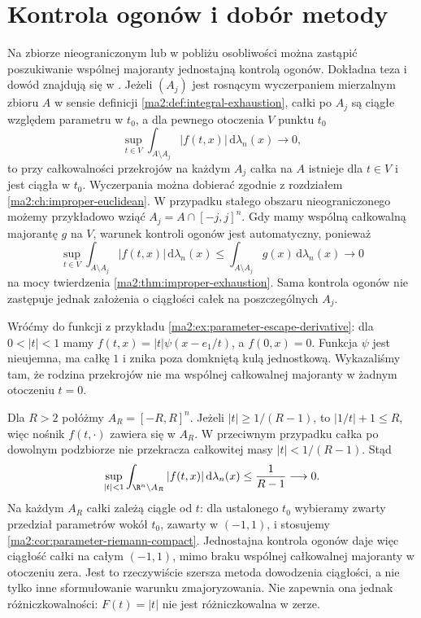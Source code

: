 \section{Kontrola ogonów i dobór metody}

Na zbiorze nieograniczonym lub w pobliżu osobliwości
można zastąpić poszukiwanie wspólnej majoranty
jednostajną kontrolą ogonów. Dokładna teza i dowód
znajdują się w
.
Jeżeli $(A_j)$ jest rosnącym wyczerpaniem mierzalnym
zbioru $A$ w sensie definicji
\ref{ma2:def:integral-exhaustion}, całki po $A_j$
są ciągłe względem parametru w $t_0$,
a dla pewnego otoczenia $V$ punktu $t_0$
\[
 \sup_{t\in V}\int_{A\setminus A_j}|f(t,x)|
 \,\mathrm d\lambda_n(x)\longrightarrow0,
\]
to przy całkowalności przekrojów na każdym $A_j$
całka na $A$ istnieje dla $t\in V$ i jest ciągła
w $t_0$. Wyczerpania można dobierać zgodnie
z rozdziałem \ref{ma2:ch:improper-euclidean}.
W przypadku stałego obszaru nieograniczonego
możemy przykładowo wziąć $A_j=A\cap[-j,j]^n$.
Gdy mamy wspólną całkowalną majorantę $g$ na $V$,
warunek kontroli ogonów jest automatyczny, ponieważ
\[
 \sup_{t\in V}\int_{A\setminus A_j}|f(t,x)|\,
 \mathrm d\lambda_n(x)
 \le\int_{A\setminus A_j}g(x)\,\mathrm d\lambda_n(x)
 \longrightarrow0
\]
na mocy twierdzenia \ref{ma2:thm:improper-exhaustion}.
Sama kontrola ogonów nie zastępuje jednak założenia
o ciągłości całek na poszczególnych $A_j$.

\begin{przyklad}
\label{ma2:ex:parameter-uniform-tails}
Wróćmy do funkcji z przykładu
\ref{ma2:ex:parameter-escape-derivative}:
dla $0<|t|<1$ mamy
$f(t,x)=|t|\psi(x-e_1/t)$, a $f(0,x)=0$.
Funkcja $\psi$ jest nieujemna, ma całkę
$1$ i znika poza domkniętą kulą jednostkową.
Wykazaliśmy tam, że rodzina przekrojów
nie ma wspólnej całkowalnej majoranty
w żadnym otoczeniu $t=0$.

Dla $R>2$ połóżmy $A_R=[-R,R]^n$.
Jeżeli $|t|\ge1/(R-1)$, to
$|1/t|+1\le R$, więc nośnik
$f(t,\cdot)$ zawiera się w $A_R$.
W przeciwnym przypadku całka po dowolnym
podzbiorze nie przekracza całkowitej
masy $|t|<1/(R-1)$. Stąd
\[
 \sup_{|t|<1}
 \int_{\R^n\setminus A_R}
 |f(t,x)|\,\mathrm d\lambda_n(x)
 \le\frac{1}{R-1}\longrightarrow0.
\]
Na każdym $A_R$ całki zależą ciągle od
$t$: dla ustalonego $t_0$ wybieramy
zwarty przedział parametrów wokół
$t_0$, zawarty w $(-1,1)$, i stosujemy
\ref{ma2:cor:parameter-riemann-compact}.
Jednostajna kontrola ogonów daje więc
ciągłość całki na całym $(-1,1)$,
mimo braku wspólnej całkowalnej majoranty
w otoczeniu zera. Jest to rzeczywiście
szersza metoda dowodzenia ciągłości,
a nie tylko inne sformułowanie warunku
zmajoryzowania.
Nie zapewnia ona jednak różniczkowalności:
$F(t)=|t|$ nie jest różniczkowalna w zerze.
\end{przyklad}


